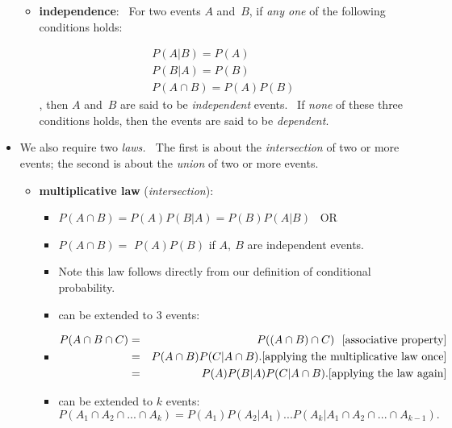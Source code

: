 \documentclass[11pt]{article}
\begin{document}
\begin{itemize}
\begin{itemize}
\item \textbf{independence}: \ For two events $A$ and\ $B$, if \textit{any
one} of the following conditions holds$:$

\begin{equation*}
\begin{array}{l}
P(A|B)=P(A) \\ 
P(B|A)=P(B) \\ 
P(A\cap B)=P(A)P(B)%
\end{array}%
\end{equation*}%
, then $A$ and\ $B$ are said to be \textit{independent }events. \ If \textit{%
none} of these three conditions holds, then the events are said to be 
\textit{dependent}.
\end{itemize}

\item We also require two \textit{laws. \ }The first is about the \textit{%
intersection} of two or more events; the second is about the \textit{union}
of two or more events.

\begin{itemize}
\item \textbf{multiplicative law} (\textit{intersection}):

\begin{itemize}
\item $P(A\cap B)=P(A)P(B|A)=P(B)P(A|B)$ \ OR \ 

\item $P(A\cap B)=$ $P(A)P(B)$ if $A,\ B$ are independent events.

\item Note this law follows directly from our definition of conditional
probability.

\item can be extended to $3$ events: \ 

\item 
\begin{eqnarray}
P(A\cap B\cap C) &=&P(\left( A\cap B\right) \cap C)\text{ \ [associative
property]}  \notag \\
&=&P(A\cap B)P(C|A\cap B).\text{[applying the multiplicative law once]} \\
&=&P(A)P(B|A)P(C|A\cap B).\text{[applying the law again]}  \notag
\end{eqnarray}

\item can be extended to $k$ events: \ $P(A_{1}\cap A_{2}\cap ...\cap
A_{k})=P(A_{1})P(A_{2}|A_{1})...P(A_{k}|A_{1}\cap A_{2}\cap ...\cap
A_{k-1}). $
\end{itemize}


\end{itemize}
\end{itemize}
\end{document}
